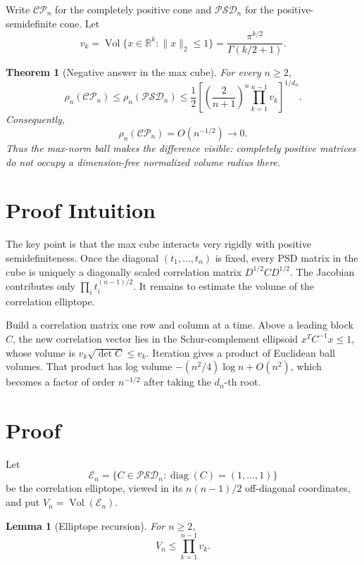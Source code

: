 \documentclass[11pt]{article}
\newtheorem{theorem}{Theorem}
\newtheorem{lemma}{Lemma}
\newcommand{\CP}{\mathcal{CP}}
\newcommand{\PSD}{\mathcal{PSD}}
\newcommand{\E}{\mathcal E}
\newcommand{\Vol}{\operatorname{Vol}}
\newcommand{\diag}{\operatorname{diag}}
\begin{document}
Write $\CP_n$ for the completely positive cone and $\PSD_n$ for the
positive-semidefinite cone.  Let
\[
 v_k=\Vol\{x\in\mathbb R^k:\lVert x\rVert_2\leq1\}
     =\frac{\pi^{k/2}}{\Gamma(k/2+1)}.
\]

\begin{theorem}[Negative answer in the max cube]\label{thm:main}
For every $n\geq2$,
\begin{equation}\label{eq:explicit}
 \rho_n(\CP_n)\leq\rho_n(\PSD_n)
 \leq\frac12
 \left[
   \left(\frac{2}{n+1}\right)^n
   \prod_{k=1}^{n-1}v_k
 \right]^{1/d_n}.
\end{equation}
Consequently,
\[
                  \rho_n(\CP_n)=O(n^{-1/2})\longrightarrow0.
\]
Thus the max-norm ball makes the difference visible: completely positive
matrices do not occupy a dimension-free normalized volume radius there.
\end{theorem}

\section*{Proof Intuition}

The key point is that the max cube interacts very rigidly with positive
semidefiniteness.  Once the diagonal $(t_1,\ldots,t_n)$ is fixed, every PSD
matrix in the cube is uniquely a diagonally scaled correlation matrix
$D^{1/2}CD^{1/2}$.  The Jacobian contributes only
$\prod_i t_i^{(n-1)/2}$.  It remains to estimate the volume of the correlation
elliptope.

Build a correlation matrix one row and column at a time.  Above a leading
block $C$, the new correlation vector lies in the Schur-complement ellipsoid
$x^TC^{-1}x\leq1$, whose volume is $v_k\sqrt{\det C}\leq v_k$.
Iteration gives a product of Euclidean ball volumes.  That product has log
volume $-(n^2/4)\log n+O(n^2)$, which becomes a factor of order
$n^{-1/2}$ after taking the $d_n$-th root.

\section*{Proof}

Let
\[
 \E_n=\{C\in\PSD_n:\diag(C)=(1,\ldots,1)\}
\]
be the correlation elliptope, viewed in its $n(n-1)/2$ off-diagonal
coordinates, and put $V_n=\Vol(\E_n)$.

\begin{lemma}[Elliptope recursion]\label{lem:elliptope}
For $n\geq2$,
\[
                       V_n\leq\prod_{k=1}^{n-1}v_k.
\]
\end{lemma}
\end{document}
